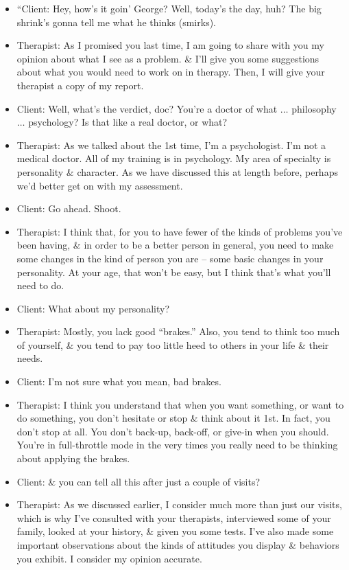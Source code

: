 \documentclass{article}
\numberwithin{equation}{section}
\begin{document}
\begin{itemize}
	\item ``Client: Hey, how's it goin' George? Well, today's the day, huh? The big shrink's gonna tell me what he thinks (smirks).
	\item Therapist: As I promised you last time, I am going to share with you my opinion about what I see as a problem. \& I'll give you some suggestions about what you would need to work on in therapy. Then, I will give your therapist a copy of my report.
	\item Client: Well, what's the verdict, doc? You're a doctor of what $\ldots$ philosophy $\ldots$ psychology? Is that like a real doctor, or what?
	\item Therapist: As we talked about the 1st time, I'm a psychologist. I'm not a medical doctor. All of my training is in psychology. My area of specialty is personality \& character. As we have discussed this at length before, perhaps we'd better get on with my assessment.
	\item Client: Go ahead. Shoot.
	\item Therapist: I think that, for you to have fewer of the kinds of problems you've been having, \& in order to be a better person in general, you need to make some changes in the kind of person you are -- some basic changes in your personality. At your age, that won't be easy, but I think that's what you'll need to do.
	\item Client: What about my personality?
	\item Therapist: Mostly, you lack good ``brakes.'' Also, you tend to think too much of yourself, \& you tend to pay too little heed to others in your life \& their needs.
	\item Client: I'm not sure what you mean, bad brakes.
	\item Therapist: I think you understand that when you want something, or want to do something, you don't hesitate or stop \& think about it 1st. In fact, you don't stop at all. You don't back-up, back-off, or give-in when you should. You're in full-throttle mode in the very times you really need to be thinking about applying the brakes.
	\item Client: \& you can tell all this after just a couple of visits?
	\item Therapist: As we discussed earlier, I consider much more than just our visits, which is why I've consulted with your therapists, interviewed some of your family, looked at your history, \& given you some tests. I've also made some important observations about the kinds of attitudes you display \& behaviors you exhibit. I consider my opinion accurate.

\end{itemize}
\end{document}
